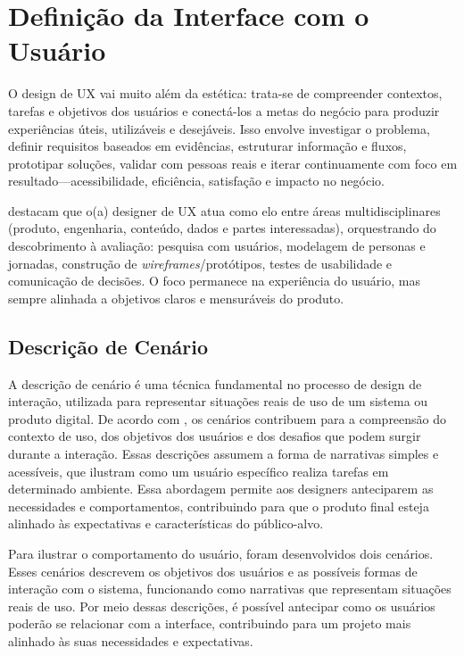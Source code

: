 \chapter{Definição da Interface com o Usuário}

O design de UX vai muito além da estética: trata-se de compreender contextos,
tarefas e objetivos dos usuários e conectá-los a metas do negócio para produzir
experiências úteis, utilizáveis e desejáveis. Isso envolve investigar o problema,
definir requisitos baseados em evidências, estruturar informação e fluxos,
prototipar soluções, validar com pessoas reais e iterar continuamente com foco em
resultado—acessibilidade, eficiência, satisfação e impacto no negócio.

\textcite{Unger2012} destacam que o(a) designer de UX atua como elo entre áreas
multidisciplinares (produto, engenharia, conteúdo, dados e partes interessadas),
orquestrando do descobrimento à avaliação: pesquisa com usuários, modelagem de
personas e jornadas, construção de \emph{wireframes}/protótipos, testes de
usabilidade e comunicação de decisões. O foco permanece na experiência do usuário,
mas sempre alinhada a objetivos claros e mensuráveis do produto.


\section{Descrição de Cenário}

A descrição de cenário é uma técnica fundamental no processo de design de interação, utilizada para representar situações reais de uso de um sistema ou produto digital. De acordo com \textcite{Rogers2013}, os cenários contribuem para a compreensão do contexto de uso, dos objetivos dos usuários e dos desafios que podem surgir durante a interação. Essas descrições assumem a forma de narrativas simples e acessíveis, que ilustram como um usuário específico realiza tarefas em determinado ambiente. Essa abordagem permite aos designers anteciparem as necessidades e comportamentos, contribuindo para que o produto final esteja alinhado às expectativas e características do público-alvo.

Para ilustrar o comportamento do usuário, foram desenvolvidos dois cenários. Esses cenários descrevem os objetivos dos usuários e as possíveis formas de interação com o sistema, funcionando como narrativas que representam situações reais de uso. Por meio dessas descrições, é possível antecipar como os usuários poderão se relacionar com a interface, contribuindo para um projeto mais alinhado às suas necessidades e expectativas.

